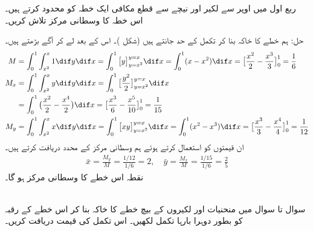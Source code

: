 ربع اول میں اوپر سے لکیر   اور نیچے سے قطع مکافی   ایک خطہ کو محدود کرتے ہیں۔ اس خطہ کا وسطانی مرکز تلاش کریں۔

حل:\quad
ہم خطے کا خاکہ بنا کر تکمل کے حد جانتے ہیں (شکل )۔ اس کے بعد  لے کر آگے بڑھتے ہیں۔
\begin{align*}
M&=\int_0^1\int_{x^2}^x1\dif y\dif x=\int_0^1\big[y\big]_{y=x^2}^{y=x}\dif x=\int_0^1(x-x^2)\dif x=\big[\frac{x^2}{2}-\frac{x^3}{3}\big]_0^1=\frac{1}{6}\\
M_x&=\int_0^1\int_{x^2}^xy\dif y\dif x=\int_0^1\big[\frac{y^2}{2}\big]_{y=x^2}^{y=x}\dif x\\
&=\int_0^1\big(\frac{x^2}{2}-\frac{x^4}{2}\big)\dif x=\big[\frac{x^3}{6}-\frac{x^5}{10}\big]_0^1=\frac{1}{15}\\
M_y&=\int_0^1\int_{x^2}^xx\dif y\dif x=\int_0^1\big[xy\big]_{y=x^2}^{y=x}\dif x=\int_0^1(x^2-x^3)\dif x=\big[\frac{x^3}{3}-\frac{x^4}{4}\big]_0^1=\frac{1}{12}
\end{align*}
ان قیمتوں کو استعمال کرتے ہوئے ہم وسطانی مرکز کے محدد دریافت کرتے ہیں۔
\begin{align*}
\bar{x}=\frac{M_y}{M}=\frac{1/12}{1/6}=2,\quad \bar{y}=\frac{M_x}{M}=\frac{1/15}{1/6}=\frac{2}{5}
\end{align*}
نقطہ  اس خطے کا وسطانی مرکز ہو گا۔

\\
سوال  تا سوال  میں  منحنیات اور لکیروں کے بیچ خطے کا خاکہ بنا کر اس خطے کے رقبہ کو بطور دوہرا بارہا  تکمل لکھیں۔ اس تکمل کی قیمت دریافت کریں۔

